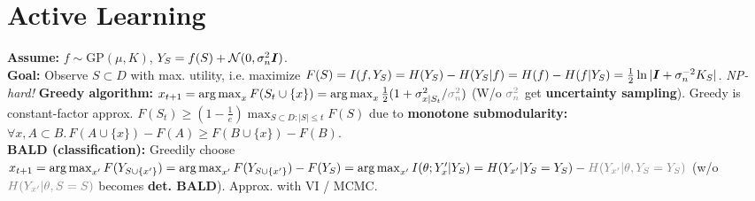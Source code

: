 \section{Active Learning}
\textbf{Assume:} $f\sim\mathrm{GP}(\mu, K)$, $Y_S = f(S) + \mathcal{N}(0,\sigma_n^2{\bm{I}})$.\\
\textbf{Goal:} Observe $S\subset D$ with max. utility, i.e. maximize $F(S) = I(f, Y_S) = H(Y_S) - H(Y_S|f) = H(f) - H(f|Y_S) = \frac{1}{2}\ln|{\bm{I}}+\sigma_n^{-2}K_S|$. \emph{NP-hard!}
\textbf{Greedy algorithm:} $x_{t+1} = \argmax_x F(S_t\cup \{x\}) = \argmax_x \frac{1}{2}(1+\sigma_{x|S_t}^2/{\color{gray}\sigma_n^2})$ (W/o $\color{gray}\sigma_n^2$ get \textbf{uncertainty sampling}). Greedy is constant-factor approx. $F(S_t) \geq (1-\frac{1}{e})\max_{S\subset D: |S| \leq t} F(S)$ due to \textbf{monotone submodularity:} $\forall x, A\subset B.\,F(A\cup\{x\}) - F(A) \geq F(B\cup\{x\}) - F(B)$.\\
\textbf{BALD (classification):} Greedily choose $x_{t+1} = \argmax_{x'}F(Y_{S\cup\{x'\}}) = \argmax_{x'}F(Y_{S\cup\{x'\}})-F(Y_{S}) = 
\argmax_{x'}I(\theta;Y_x'|Y_{S}) = H(Y_{x'}|Y_{S}=Y_{S}) - {\color{gray}H(Y_{x'}|\theta, Y_{S}=Y_{S})}$ (w/o ${\color{gray}H(Y_{x'}|\theta,S=S)}$ becomes \textbf{det. BALD}). Approx. with VI / MCMC.
